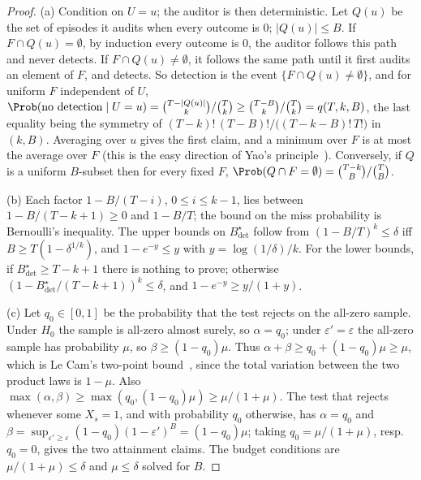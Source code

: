 \begin{proof}
(a) Condition on $U=u$; the auditor is then deterministic. Let $Q(u)$ be the
set of episodes it audits when every outcome is $0$; $|Q(u)|\le B$. If
$F\cap Q(u)=\emptyset$, by induction every outcome is $0$, the auditor follows
this path and never detects. If $F\cap Q(u)\ne\emptyset$, it follows the same
path until it first audits an element of $F$, and detects. So detection is the
event $\{F\cap Q(u)\neq\emptyset\}$, and for uniform $F$ independent of $U$,
$\Prob(\text{no detection}\mid U=u)=\binom{T-|Q(u)|}{k}/\binom Tk\ge
\binom{T-B}{k}/\binom Tk=q(T,k,B)$, the last equality being the symmetry of
$(T-k)!\,(T-B)!/\bigl((T-k-B)!\,T!\bigr)$ in $(k,B)$. Averaging over $u$ gives the first
claim, and a minimum over $F$ is at most the average over $F$ (this is the easy
direction of Yao's principle~\cite{yao1977probabilistic}). Conversely, if $Q$ is
a uniform $B$-subset then for every fixed $F$,
$\Prob(Q\cap F=\emptyset)=\binom{T-k}{B}/\binom TB$.

(b) Each factor $1-B/(T-i)$, $0\le i\le k-1$, lies between $1-B/(T-k+1)\ge0$
and $1-B/T$; the bound on the miss probability is Bernoulli's inequality. The
upper bounds on $B^\star_{\mathrm{det}}$ follow from $(1-B/T)^k\le\delta$ iff
$B\ge T(1-\delta^{1/k})$, and $1-e^{-y}\le y$ with $y=\log(1/\delta)/k$. For the
lower bounds, if $B^\star_{\mathrm{det}}\ge T-k+1$ there is nothing to prove;
otherwise $(1-B^\star_{\mathrm{det}}/(T-k+1))^k\le\delta$, and
$1-e^{-y}\ge y/(1+y)$.

(c) Let $q_0\in[0,1]$ be the probability that the test rejects on the all-zero
sample. Under $H_0$ the sample is all-zero almost surely, so $\alpha=q_0$; under
$\varepsilon'=\varepsilon$ the all-zero sample has probability $\mu$, so
$\beta\ge(1-q_0)\mu$. Thus $\alpha+\beta\ge q_0+(1-q_0)\mu\ge\mu$, which is Le
Cam's two-point bound~\cite{lecam1973convergence,yu1997assouad}, since the total
variation between the two product laws is $1-\mu$. Also
$\max(\alpha,\beta)\ge\max(q_0,(1-q_0)\mu)\ge\mu/(1+\mu)$. The test that rejects
whenever some $X_s=1$, and with probability $q_0$ otherwise, has $\alpha=q_0$
and $\beta=\sup_{\varepsilon'\ge\varepsilon}(1-q_0)(1-\varepsilon')^B=(1-q_0)\mu$;
taking $q_0=\mu/(1+\mu)$, resp.\ $q_0=0$, gives the two attainment claims. The
budget conditions are $\mu/(1+\mu)\le\delta$ and $\mu\le\delta$ solved for $B$.
\end{proof}

